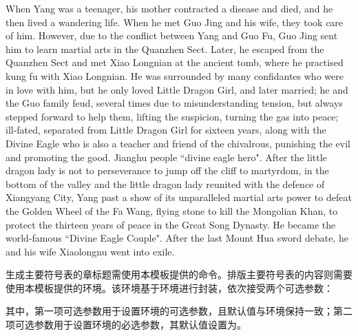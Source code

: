 \documentclass[print, doctor, vlined]{DissertUESTC}
\begin{document}
	When Yang was a teenager, his mother contracted a disease and died, and he then lived a wandering life. When he met Guo Jing and his wife, they took care of him. However, due to the conflict between Yang and Guo Fu, Guo Jing sent him to learn martial arts in the Quanzhen Sect. Later, he escaped from the Quanzhen Sect and met Xiao Longnian at the ancient tomb, where he practised kung fu with Xiao Longnian. He was surrounded by many confidantes who were in love with him, but he only loved Little Dragon Girl, and later married; he and the Guo family feud, several times due to misunderstanding tension, but always stepped forward to help them, lifting the suspicion, turning the gas into peace; ill-fated, separated from Little Dragon Girl for sixteen years, along with the Divine Eagle who is also a teacher and friend of the chivalrous, punishing the evil and promoting the good. Jianghu people ``divine eagle hero". After the little dragon lady is not to perseverance to jump off the cliff to martyrdom, in the bottom of the valley and the little dragon lady reunited with the defence of Xiangyang City, Yang past a show of its unparalleled martial arts power to defeat the Golden Wheel of the Fa Wang, flying stone to kill the Mongolian Khan, to protect the thirteen years of peace in the Great Song Dynasty. He became the world-famous ``Divine Eagle Couple". After the last Mount Hua sword debate, he and his wife Xiaolongnu went into exile.
	
	
	
	\tableofcontents  %
	
	\listoffigures  %
	
	\listoftables  %
	
	\listofsymbs  %
	
	生成主要符号表的章标题需使用本模板提供的命令。排版主要符号表的内容则需要使用本模板提供的环境。该环境基于环境进行封装，依次接受两个可选参数：
	
	
	\noindent 其中，第一项可选参数用于设置环境的可选参数，且默认值与环境保持一致；第二项可选参数用于设置环境的必选参数，其默认值设置为。
	
\end{document}
